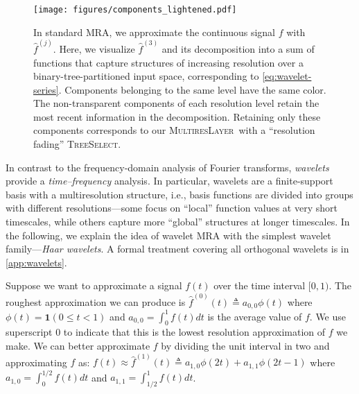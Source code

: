 \documentclass{article}
\theoremstyle{plain}
\theoremstyle{definition}
\theoremstyle{remark}
\newcommand{\ourlayer}{\textsc{MultiresLayer}}
\begin{document}
\begin{figure}[t]
\texttt{[image: figures/components\_lightened.pdf]}
\centering
\vspace{-2mm}
\caption{In standard MRA, we approximate the continuous signal $f$ with $\hat{f}^{(j)}$. Here, we visualize $\hat{f}^{(3)}$ and its decomposition into a sum of functions that capture structures of increasing resolution over a binary-tree-partitioned input space, corresponding to \cref{eq:wavelet-series}. Components belonging to the same level have the same color. The non-transparent components of each resolution level retain the most recent information in the decomposition. Retaining only these components corresponds to our \ourlayer\ with a ``resolution fading'' \textsc{TreeSelect}.
} \vspace{-4mm}
\label{fig:components}
\end{figure}






In contrast to the frequency-domain analysis of Fourier transforms, \emph{wavelets} provide a \emph{time--frequency} analysis. In particular, wavelets are a finite-support basis with a multiresolution structure, i.e., basis functions are divided into groups with different resolutions---some focus on ``local'' function values at very short timescales, while others capture more ``global'' structures at longer timescales. 
In the following, we explain the idea of wavelet MRA with the simplest wavelet family---\emph{Haar wavelets}. 
A formal treatment covering all orthogonal wavelets is in \cref{app:wavelets}. 

Suppose we want to approximate a signal $f(t)$ over the time interval $[0, 1)$. 
The roughest approximation we can produce is $\hat{f}^{(0)}(t) \triangleq a_{0,0} \phi(t)$ where 
$
\phi(t) = \mathbf{1}(0 \leq t < 1)
$
and $a_{0,0} = \int_0^1 f(t) dt$ is the average value of $f$. 
We use superscript $0$ to indicate that this is the lowest resolution approximation of $f$ we make.
We can better approximate $f$ by dividing the unit interval in two and approximating $f$ as: $f(t) \approx \hat{f}^{(1)}(t) \triangleq a_{1,0}\phi(2t) + a_{1,1}\phi(2t-1)$ where $a_{1,0}=\int_0^{1/2} f(t) dt$ and $a_{1,1}=\int_{1/2}^1 f(t)dt$.
\end{document}
